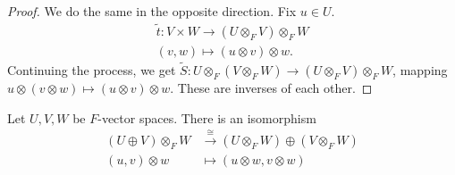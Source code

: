 \documentclass[10pt]{mypackage}
\begin{document}
\begin{proof}
    We do the same in the opposite direction. Fix $u\in U$.
    \begin{align*}
      \tilde{t}: V\times W \rightarrow \left(U\otimes_{F}V\right)\otimes_{F}W\\
      \left(v,w\right) \mapsto \left(u\otimes v\right)\otimes w.
    \end{align*}
    Continuing the process, we get $\widetilde{S}: U\otimes_{F} \left(V\otimes_{F} W\right)\rightarrow \left(U\otimes_{F} V\right)\otimes_{F} W$, mapping $u\otimes \left(v\otimes w\right)\mapsto \left(u\otimes v\right)\otimes w$. These are inverses of each other.
  \end{proof}
  \begin{theorem}
    Let $U,V,W$ be $F$-vector spaces. There is an isomorphism
    \begin{align*}
      \left(U\oplus V\right)\otimes_{F} W &\xrightarrow{\cong} \left(U\otimes_{F}W\right)\oplus \left(V\otimes_{F}W\right)\\
      \left(u,v\right)\otimes w &\mapsto \left(u\otimes w,v\otimes w\right)
    \end{align*}
  \end{theorem}
\end{document}
